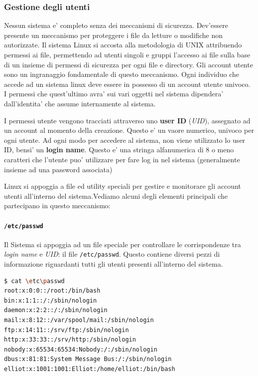 \subsubsection{Gestione degli utenti}
Nessun sistema e' completo senza dei meccanismi di sicurezza. Dev'essere presente un meccanismo per proteggere i file da letture o modifiche non autorizzate. Il sistema Linux si accosta  alla metodologia di UNIX attribuendo permessi ai file, permettendo ad utenti singoli e gruppi l'accesso ai file sulla base di un insieme di permessi di sicurezza per ogni file e directory. Gli account utente sono un ingranaggio fondamentale di questo meccanismo. Ogni individuo che accede ad un sistema linux deve essere in possesso di un account utente univoco. I permessi che quest'ultimo avra' sui vari oggetti nel sistema dipendera' dall'identita' che assume internamente al sistema.

I permessi utente vengono tracciati attraverso uno \textbf{user ID} (\emph{UID}), assegnato ad un account al momento della creazione. Questo e' un vaore numerico, univoco per ogni utente. Ad ogni modo per accedere al sistema, non viene utilizzato lo user ID, bensi' un \textbf{login name}. Questo e' una stringa alfanumerica di 8 o meno caratteri che l'utente puo' utilizzare per fare log in nel sistema (generalmente insieme ad una password associata)

Linux si appoggia a file ed utility speciali per gestire e monitorare gli account utenti all'interno del sistema.Vediamo alcuni degli elementi principali che partecipano in questo meccanismo:

\paragraph{\texttt{/etc/passwd}} Il Sistema si appoggia ad un file speciale per controllare le corrispondenze tra \emph{login name} e \emph{UID}: il file \texttt{/etc/passwd}. Questo contiene diversi pezzi di informazione riguardanti tutti gli utenti presenti all'interno del sistema.

\begin{lstlisting}[language=bash,basicstyle=\ttfamily,frame=single,caption={Struttura di un file /etc/passwd},captionpos=b]
$ cat \etc\passwd
root:x:0:0::/root:/bin/bash
bin:x:1:1::/:/sbin/nologin
daemon:x:2:2::/:/sbin/nologin
mail:x:8:12::/var/spool/mail:/sbin/nologin
ftp:x:14:11::/srv/ftp:/sbin/nologin
http:x:33:33::/srv/http:/sbin/nologin
nobody:x:65534:65534:Nobody:/:/sbin/nologin
dbus:x:81:81:System Message Bus:/:/sbin/nologin
elliot:x:1001:1001:Elliot:/home/elliot:/bin/bash
\end{lstlisting}

